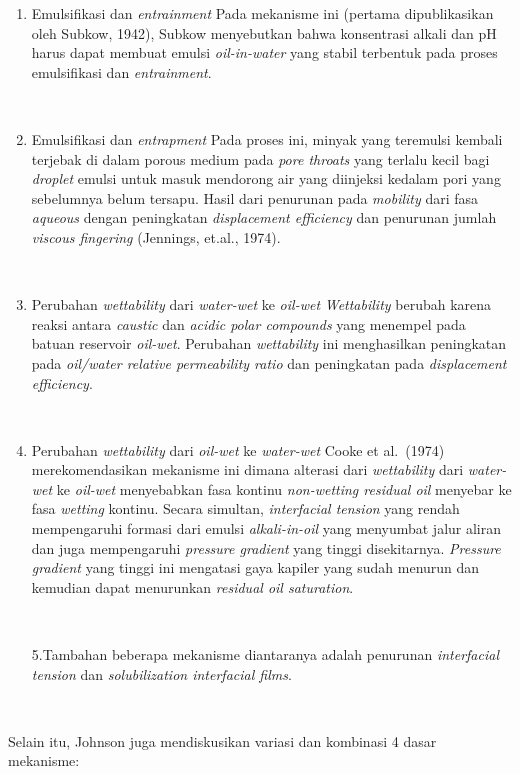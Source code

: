 \documentclass[
]{book}
\providecommand{\tightlist}{%
  \setlength{\itemsep}{0pt}\setlength{\parskip}{0pt}}
\begin{document}
\begin{enumerate}
\def\labelenumi{\arabic{enumi}.}
\tightlist
\item
  Emulsifikasi dan \emph{entrainment}
  Pada mekanisme ini (pertama dipublikasikan oleh Subkow, 1942), Subkow menyebutkan bahwa konsentrasi alkali dan pH harus dapat membuat emulsi \emph{oil-in-water} yang stabil terbentuk pada proses emulsifikasi dan \emph{entrainment}.

  ~
\item
  Emulsifikasi dan \emph{entrapment}
  Pada proses ini, minyak yang teremulsi kembali terjebak di dalam porous medium pada \emph{pore throats} yang terlalu kecil bagi \emph{droplet} emulsi untuk masuk mendorong air yang diinjeksi kedalam pori yang sebelumnya belum tersapu. Hasil dari penurunan pada \emph{mobility} dari fasa \emph{aqueous} dengan peningkatan \emph{displacement efficiency} dan penurunan jumlah \emph{viscous fingering} (Jennings, et.al., 1974).

  ~
\item
  Perubahan \emph{wettability} dari \emph{water-wet} ke \emph{oil-wet}
  \emph{Wettability} berubah karena reaksi antara \emph{caustic} dan \emph{acidic polar compounds} yang menempel pada batuan reservoir \emph{oil-wet}. Perubahan \emph{wettability} ini menghasilkan peningkatan pada \emph{oil/water relative permeability ratio} dan peningkatan pada \emph{displacement efficiency}.

  ~
\item
  Perubahan \emph{wettability} dari \emph{oil-wet} ke \emph{water-wet}
  Cooke et al.~(1974) merekomendasikan mekanisme ini dimana alterasi dari \emph{wettability} dari \emph{water-wet} ke \emph{oil-wet} menyebabkan fasa kontinu \emph{non-wetting residual oil} menyebar ke fasa \emph{wetting} kontinu. Secara simultan, \emph{interfacial tension} yang rendah mempengaruhi formasi dari emulsi \emph{alkali-in-oil} yang menyumbat jalur aliran dan juga mempengaruhi \emph{pressure gradient} yang tinggi disekitarnya. \emph{Pressure gradient} yang tinggi ini mengatasi gaya kapiler yang sudah menurun dan kemudian dapat menurunkan \emph{residual oil saturation}.

  ~

  5.Tambahan beberapa mekanisme diantaranya adalah penurunan \emph{interfacial tension} dan \emph{solubilization interfacial films}.

  ~
\end{enumerate}

Selain itu, Johnson juga mendiskusikan variasi dan kombinasi 4 dasar mekanisme:
\end{document}
